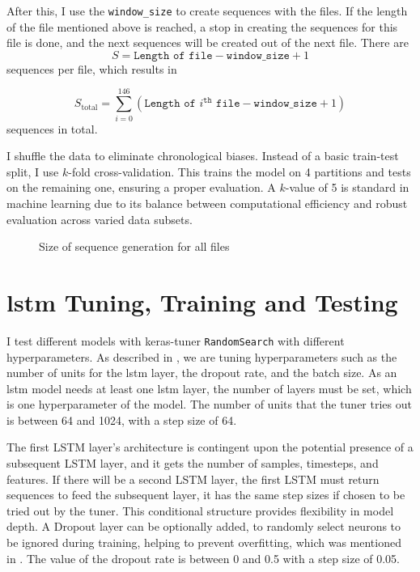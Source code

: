 After this, I use the \texttt{window\_size} to create sequences with the files.
If the length of the file mentioned above is reached, a stop in creating the sequences for this file is done, and the next sequences will be created out of the next file.
There are 
\[S = \texttt{Length of file} - \texttt{window\_size} + 1\] 
sequences per file, which results in 

\[
    S_{\text{total}} = \sum_{i=0}^{146} (\texttt{Length of } i^{\texttt{th}} \texttt{ file} - \texttt{window\_size} + 1)
\]
sequences in total.

I shuffle the data to eliminate chronological biases. 
Instead of a basic train-test split, I use $k$-fold cross-validation.
This trains the model on 4 partitions and tests on the remaining one, ensuring a proper evaluation.
A $k$-value of 5 is standard in machine learning due to its balance between computational efficiency and robust evaluation across varied data subsets.

\begin{figure}[h]
    \centering
    
    \caption{Size of sequence generation for all files}
    \label{fig:sequence_generation}
\end{figure}



\section{\ac{lstm} Tuning, Training and Testing}

I test different models with keras-tuner \texttt{RandomSearch} with different hyperparameters.
As described in , we are tuning hyperparameters such as the number of units for the \ac{lstm} layer, the dropout rate, and the batch size.
As an \ac{lstm} model needs at least one \ac{lstm} layer, the number of layers must be set, which is one hyperparameter of the model.
The number of units that the tuner tries out is between 64 and 1024, with a step size of 64.

The first LSTM layer's architecture is contingent upon the potential presence of a subsequent LSTM layer, and it gets the number of samples, timesteps, and features.
If there will be a second LSTM layer, the first LSTM must return sequences to feed the subsequent layer, it has the same step sizes if chosen to be tried out by the tuner.
This conditional structure provides flexibility in model depth.
A Dropout layer can be optionally added, to randomly select neurons to be ignored during training, helping to prevent overfitting, which was mentioned in .
The value of the dropout rate is between 0 and 0.5 with a step size of 0.05.

